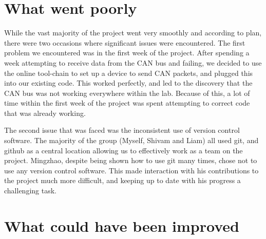 \section{What went poorly}

While the vast majority of the project went very smoothly and according to plan, 
there were two occasions where significant issues were encountered. The first 
problem we encountered was in the first week of the project. After spending a 
week attempting to receive data from the CAN bus and failing, we decided to use 
the online tool-chain to set up a device to send CAN packets, and plugged this 
into our existing code. This worked perfectly, and led to the discovery that 
the CAN bus was not working everywhere within the lab. Because of this, a lot of 
time within the first week of the project was spent attempting to correct code 
that was already working. 
\par\bigskip\noindent
The second issue that was faced was the inconsistent use of version control 
software. The majority of the group (Myself, Shivam and Liam) all used git, and 
github as a central location allowing us to effectively work as a team on the 
project. Mingzhao, despite being shown how to use git many times, chose not 
to use any version control software. This made interaction with his contributions
to the project much more difficult, and keeping up to date with his progress a 
challenging task.

\section{What could have been improved}

